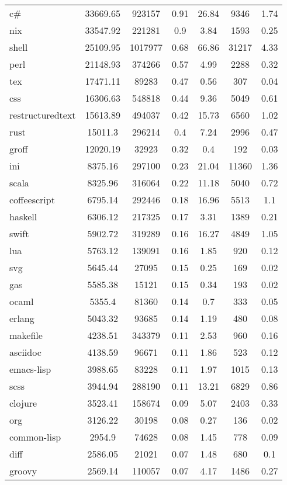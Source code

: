 \begin{longtable}{l|ccc|ccc}
c\# & 33669.65 & 923157 & 0.91 & 26.84 & 9346 & 1.74 \\
nix & 33547.92 & 221281 & 0.9 & 3.84 & 1593 & 0.25 \\
shell & 25109.95 & 1017977 & 0.68 & 66.86 & 31217 & 4.33 \\
perl & 21148.93 & 374266 & 0.57 & 4.99 & 2288 & 0.32 \\
tex & 17471.11 & 89283 & 0.47 & 0.56 & 307 & 0.04 \\
css & 16306.63 & 548818 & 0.44 & 9.36 & 5049 & 0.61 \\
restructuredtext & 15613.89 & 494037 & 0.42 & 15.73 & 6560 & 1.02 \\
rust & 15011.3 & 296214 & 0.4 & 7.24 & 2996 & 0.47 \\
groff & 12020.19 & 32923 & 0.32 & 0.4 & 192 & 0.03 \\
ini & 8375.16 & 297100 & 0.23 & 21.04 & 11360 & 1.36 \\
scala & 8325.96 & 316064 & 0.22 & 11.18 & 5040 & 0.72 \\
coffeescript & 6795.14 & 292446 & 0.18 & 16.96 & 5513 & 1.1 \\
haskell & 6306.12 & 217325 & 0.17 & 3.31 & 1389 & 0.21 \\
swift & 5902.72 & 319289 & 0.16 & 16.27 & 4849 & 1.05 \\
lua & 5763.12 & 139091 & 0.16 & 1.85 & 920 & 0.12 \\
svg & 5645.44 & 27095 & 0.15 & 0.25 & 169 & 0.02 \\
gas & 5585.38 & 15121 & 0.15 & 0.34 & 193 & 0.02 \\
ocaml & 5355.4 & 81360 & 0.14 & 0.7 & 333 & 0.05 \\
erlang & 5043.32 & 93685 & 0.14 & 1.19 & 480 & 0.08 \\
makefile & 4238.51 & 343379 & 0.11 & 2.53 & 960 & 0.16 \\
asciidoc & 4138.59 & 96671 & 0.11 & 1.86 & 523 & 0.12 \\
emacs-lisp & 3988.65 & 83228 & 0.11 & 1.97 & 1015 & 0.13 \\
scss & 3944.94 & 288190 & 0.11 & 13.21 & 6829 & 0.86 \\
clojure & 3523.41 & 158674 & 0.09 & 5.07 & 2403 & 0.33 \\
org & 3126.22 & 30198 & 0.08 & 0.27 & 136 & 0.02 \\
common-lisp & 2954.9 & 74628 & 0.08 & 1.45 & 778 & 0.09 \\
diff & 2586.05 & 21021 & 0.07 & 1.48 & 680 & 0.1 \\
groovy & 2569.14 & 110057 & 0.07 & 4.17 & 1486 & 0.27 \\

\end{longtable}
